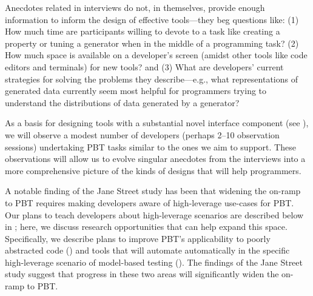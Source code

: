 %
Anecdotes related in interviews do not, in
themselves, provide enough information to inform the design of
effective tools---they beg questions like: (1) How much time
are participants willing to devote to
a task like creating a property or tuning a generator when in the
middle of a programming task? (2) How much space is available on a developer's
screen (amidst other tools like code editors and terminals) for
new
tools? and (3) What are developers' current strategies for solving the
problems they describe---e.g., what representations of generated data
currently seem most helpful
for programmers trying to understand the distributions of data generated by a
generator?

As a basis for designing tools with a substantial novel interface
component (see ), we will observe a modest number
of developers (perhaps 2--10 observation sessions)
undertaking PBT tasks similar to the ones we
aim to support. These observations will allow us to evolve
singular anecdotes from the interviews into a more comprehensive picture of
the kinds of designs that will help programmers.



%
%

A notable finding of the Jane Street study has been that widening the
on-ramp to PBT requires making developers aware of high-leverage
use-cases for PBT. Our plans to teach developers about high-leverage
scenarios are described below in ; here,
we discuss research opportunities that can help expand this space.
Specifically, we describe plans to improve PBT's applicability to
poorly abstracted code () and
tools that will automate automatically in the specific high-leverage
scenario of model-based testing ().
The findings of the Jane Street study suggest that progress in these
two areas will significantly widen the on-ramp to PBT.


